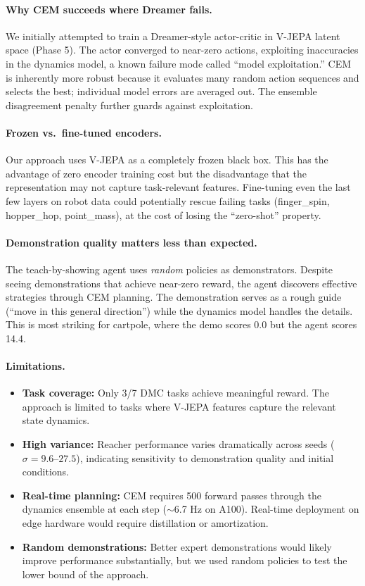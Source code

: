 \documentclass{article}
\begin{document}
\paragraph{Why CEM succeeds where Dreamer fails.}
We initially attempted to train a Dreamer-style actor-critic in V-JEPA latent space (Phase 5). The actor converged to near-zero actions, exploiting inaccuracies in the dynamics model, a known failure mode called ``model exploitation.'' CEM is inherently more robust because it evaluates many random action sequences and selects the best; individual model errors are averaged out. The ensemble disagreement penalty further guards against exploitation.

\paragraph{Frozen vs.\ fine-tuned encoders.}
Our approach uses V-JEPA as a completely frozen black box. This has the advantage of zero encoder training cost but the disadvantage that the representation may not capture task-relevant features. Fine-tuning even the last few layers on robot data could potentially rescue failing tasks (finger\_spin, hopper\_hop, point\_mass), at the cost of losing the ``zero-shot'' property.

\paragraph{Demonstration quality matters less than expected.}
The teach-by-showing agent uses \emph{random} policies as demonstrators. Despite seeing demonstrations that achieve near-zero reward, the agent discovers effective strategies through CEM planning. The demonstration serves as a rough guide (``move in this general direction'') while the dynamics model handles the details. This is most striking for cartpole, where the demo scores 0.0 but the agent scores 14.4.

\paragraph{Limitations.}
\begin{itemize}
    \item \textbf{Task coverage:} Only 3/7 DMC tasks achieve meaningful reward. The approach is limited to tasks where V-JEPA features capture the relevant state dynamics.
    \item \textbf{High variance:} Reacher performance varies dramatically across seeds ($\sigma = 9.6$--$27.5$), indicating sensitivity to demonstration quality and initial conditions.
    \item \textbf{Real-time planning:} CEM requires 500 forward passes through the dynamics ensemble at each step ($\sim$6.7 Hz on A100). Real-time deployment on edge hardware would require distillation or amortization.
    \item \textbf{Random demonstrations:} Better expert demonstrations would likely improve performance substantially, but we used random policies to test the lower bound of the approach.
\end{itemize}
\end{document}
